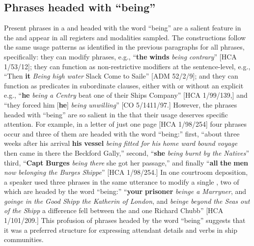 \subsection{{Phrases headed with “being”}}%

Present  phrases in a  and headed with the word “being” are a salient feature in the  and appear in all registers and modalities sampled. The  constructions follow the same usage patterns as identified in the previous paragraphs for all  phrases, specifically: they can modify  phrases, e.g., “\textbf{the} \textbf{winds} \textit{being contrary}” [HCA 1/53/12]; they can function as non-restrictive modifiers at the sentence-level, e.g., “Then \textbf{it} \textit{Being high water} Slack Come to Saile” [ADM 52/2/9]; and they can function as predicates in subordinate clauses, either with or without an explicit  e.g., “\textbf{he} \textit{being a Centry} beat one of their Ships Company” [HCA 1/99/139,] and “they forced him [\textbf{he}] \textit{being unwilling}” [CO 5/1411/97.] However, the  phrases headed with “being” are so salient in the  that their usage deserves specific attention. For example, in a letter of just one page [HCA 1/98/254] four  phrases occur and three of them are headed with the word “being:” first, “about three weeks after his arrival \textbf{his} \textbf{vessel} \textit{being fitted for his home ward bound voyage} then came in there the Beckford Gally,” second, “\textbf{she} \textit{being burnt by the Natives}” third, “\textbf{Capt} \textbf{Burges} \textit{being there} she got her passage,” and finally “\textbf{all} \textbf{the} \textbf{men} \textit{now belonging the Burges Shippe}” [HCA 1/98/254.] In one courtroom deposition, a speaker used three  phrases in the same utterance to modify a single , two of which are headed by the word “being:” “\textbf{your} \textbf{prisoner} \textit{beinge a Marryner}, and \textit{goinge in the Good Shipp the Katherin of London}, and \textit{beinge beyond the Seas out of the Shipp} a difference fell between the  and one Richard Chubb” [HCA 1/101/209.] This profusion of  phrases headed by the word “being” suggests that it was a preferred structure for expressing attendant details and  verbs in ship communities. 

